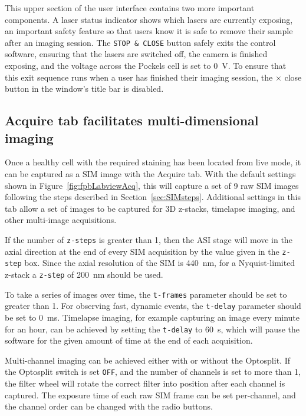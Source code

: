 
This upper section of the user interface contains two more important components.
A laser status indicator shows which lasers are currently exposing, an important safety feature so that users know it is safe to remove their sample after an imaging session.
The \texttt{STOP \& CLOSE} button safely exits the control software, ensuring that the lasers are switched off, the camera is finished exposing, and the voltage across the Pockels cell is set to \SI{0}{\volt}.
To ensure that this exit sequence runs when a user has finished their imaging session, the $\times$ close button in the window's title bar is disabled.

\subsection{Acquire tab facilitates multi-dimensional imaging}
Once a healthy cell with the required staining has been located from live mode, it can be captured as a SIM image with the Acquire tab.
With the default settings shown in Figure~\ref{fig:fpbLabviewAcq}, this will capture a set of 9 raw SIM images following the steps described in Section~\ref{sec:SIMsteps}.
Additional settings in this tab allow a set of images to be captured for 3D z-stacks, timelapse imaging, and other multi-image acquisitions.

If the number of \texttt{z-steps} is greater than 1, then the ASI stage will move in the axial direction at the end of every SIM acquisition by the value given in the \texttt{z-step} box.
Since the axial resolution of the SIM is \SI{440}{\nano\meter}, for a Nyquist-limited z-stack a \texttt{z-step} of \SI{200}{\nano\meter} should be used.

To take a series of images over time, the \texttt{t-frames} parameter should be set to greater than 1.
For observing fast, dynamic events, the \texttt{t-delay} parameter should be set to \SI{0}{\milli\second}.
Timelapse imaging, for example capturing an image every minute for an hour, can be achieved by setting the \texttt{t-delay} to \SI{60}{\second}, which will pause the software for the given amount of time at the end of each acquisition.

Multi-channel imaging can be achieved either with or without the Optosplit.
If the Optosplit switch is set \texttt{OFF}, and the number of channels is set to more than 1, the filter wheel will rotate the correct filter into position after each channel is captured.
The exposure time of each raw SIM frame can be set per-channel, and the channel order can be changed with the radio buttons.

